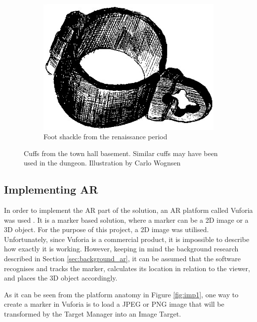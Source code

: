 \begin{figure}[h!]
\begin{subfigure}[h!]{0.3\textwidth}
        \includegraphics[width=\textwidth]{figures/chains2.jpg}
        \caption{Foot shackle from the renaissance period}\label{fig:chains2}
    \end{subfigure}
    \caption{Cuffs from the town hall basement. Similar cuffs may have been used in the dungeon. Illustration by Carlo Wognsen \cite{Riismoller1961}}\label{fig:chains}
\end{figure}

\subsection{Implementing AR}
In order to implement the AR part of the solution, an AR platform called Vuforia was used  \cite{Vuforia}. It is a marker based solution, where a marker can be a 2D image or a 3D object. For the purpose of this project, a 2D image was utilised. Unfortunately, since Vuforia is a commercial product, it is impossible to describe how exactly it is working. However, keeping in mind the background research described in Section \ref{sec:background_ar}, it can be assumed that the software recognises and tracks the marker, calculates its location in relation to the viewer, and places the 3D object accordingly. 

As it can be seen from the platform anatomy in Figure \ref{fig:imp1}, one way to create a marker in Vuforia is to load a JPEG or PNG image that will be transformed by the Target Manager into an Image Target. 

